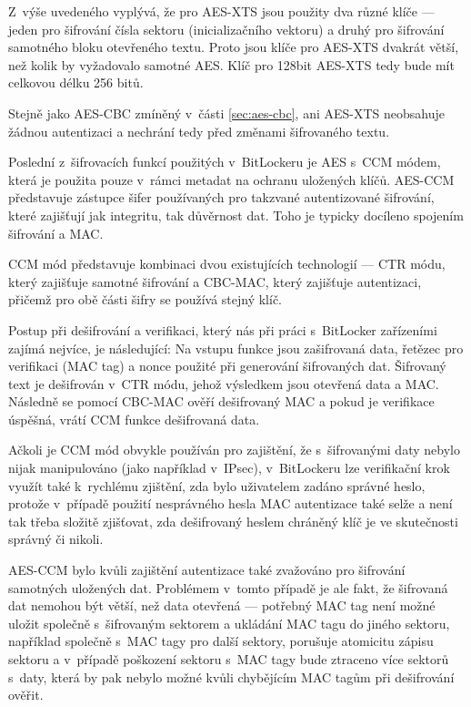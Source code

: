 Z~výše uvedeného vyplývá, že pro AES-XTS jsou použity dva různé klíče --- jeden pro šifrování čísla sektoru (inicializačního vektoru) a druhý pro šifrování samotného bloku otevřeného textu. Proto jsou klíče pro AES-XTS dvakrát větší, než kolik by vyžadovalo samotné AES. Klíč pro 128bit AES-XTS tedy bude mít celkovou délku 256 bitů.

Stejně jako AES-CBC zmíněný v~části \ref{sec:aes-cbc}, ani AES-XTS neobsahuje žádnou autentizaci a nechrání tedy před změnami šifrovaného textu.


Poslední z~šifrovacích funkcí použitých v~BitLockeru je AES s~CCM módem, která je použita pouze v~rámci metadat na ochranu uložených klíčů. AES-CCM představuje zástupce šifer používaných pro takzvané autentizované šifrování, které zajišťují jak integritu, tak důvěrnost dat. Toho je typicky docíleno spojením šifrování a MAC.\cite{ISO2009}

CCM mód představuje kombinaci dvou existujících technologií --- CTR módu, který zajišťuje samotné šifrování a CBC-MAC, který zajišťuje autentizaci, přičemž pro obě části šifry se používá stejný klíč.

Postup při dešifrování a verifikaci, který nás při práci s~BitLocker zařízeními zajímá nejvíce, je následující: Na vstupu funkce jsou zašifrovaná data, řetězec pro ve\-ri\-fi\-ka\-ci (MAC tag) a nonce použité při generování šifrovaných dat. Šifrovaný text je dešifrován v~CTR módu, jehož výsledkem jsou otevřená data a MAC. Následně se pomocí CBC-MAC ověří dešifrovaný MAC a pokud je verifikace úspěšná, vrátí CCM funkce dešifrovaná data.\cite{Dworkin2004}

Ačkoli je CCM mód obvykle používán pro zajištění, že s~šifrovanými daty nebylo nijak manipulováno (jako například v~IPsec\cite{Housley2005}), v~BitLockeru lze verifikační krok využít také k~rychlému zjištění, zda bylo uživatelem zadáno správné heslo, protože v~případě použití nesprávného hesla MAC autentizace také selže a není tak třeba složitě zjišťovat, zda dešifrovaný heslem chráněný klíč je ve skutečnosti správný či nikoli.

AES-CCM bylo kvůli zajištění autentizace také zvažováno pro šifrování samotných uložených dat. Problémem v~tomto případě je ale fakt, že šifrovaná dat nemohou být větší, než data otevřená --- potřebný MAC tag není možné uložit společně s~šifrovaným sektorem a ukládání MAC tagu do jiného sektoru, například společně s~MAC tagy pro další sektory, porušuje atomicitu zápisu sektoru a v~případě poškození sektoru s~MAC tagy bude ztraceno více sektorů s~daty, která by pak nebylo možné kvůli chybějícím MAC tagům při dešifrování ověřit.\cite{Ferguson2006}

